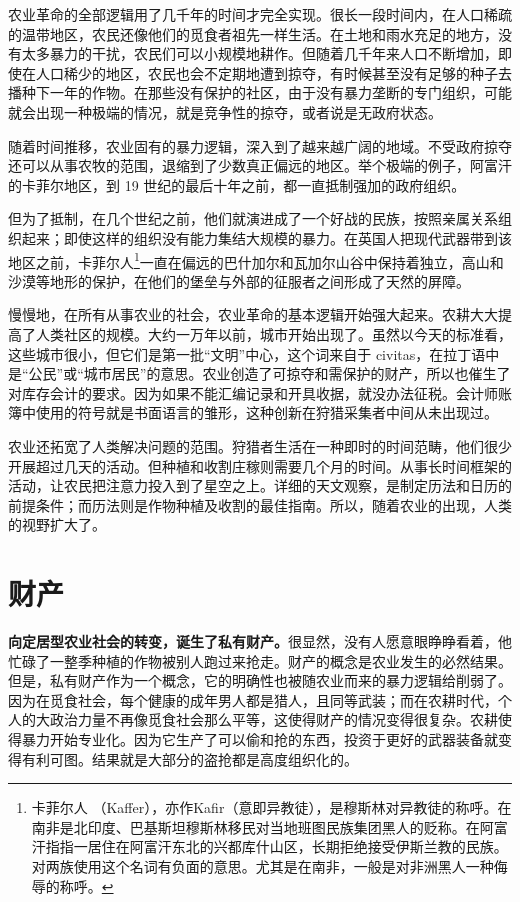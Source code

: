 农业革命的全部逻辑用了几千年的时间才完全实现。很长一段时间内，在人口稀疏的温带地区，农民还像他们的觅食者祖先一样生活。在土地和雨水充足的地方，没有太多暴力的干扰，农民们可以小规模地耕作。但随着几千年来人口不断增加，即使在人口稀少的地区，农民也会不定期地遭到掠夺，有时候甚至没有足够的种子去播种下一年的作物。在那些没有保护的社区，由于没有暴力垄断的专门组织，可能就会出现一种极端的情况，就是竞争性的掠夺，或者说是无政府状态。

随着时间推移，农业固有的暴力逻辑，深入到了越来越广阔的地域。不受政府掠夺还可以从事农牧的范围，退缩到了少数真正偏远的地区。举个极端的例子，阿富汗的卡菲尔地区，到 19 世纪的最后十年之前，都一直抵制强加的政府组织。

但为了抵制，在几个世纪之前，他们就演进成了一个好战的民族，按照亲属关系组织起来；即使这样的组织没有能力集结大规模的暴力。在英国人把现代武器带到该地区之前，卡菲尔人\footnote{卡菲尔人 （Kaffer），亦作Kafir（意即异教徒），是穆斯林对异教徒的称呼。在南非是北印度、巴基斯坦穆斯林移民对当地班图民族集团黑人的贬称。在阿富汗指指一居住在阿富汗东北的兴都库什山区，长期拒绝接受伊斯兰教的民族。对两族使用这个名词有负面的意思。尤其是在南非，一般是对非洲黑人一种侮辱的称呼。}一直在偏远的巴什加尔和瓦加尔山谷中保持着独立，高山和沙漠等地形的保护，在他们的堡垒与外部的征服者之间形成了天然的屏障。

慢慢地，在所有从事农业的社会，农业革命的基本逻辑开始强大起来。农耕大大提高了人类社区的规模。大约一万年以前，城市开始出现了。虽然以今天的标准看，这些城市很小，但它们是第一批“文明”中心，这个词来自于 civitas，在拉丁语中是“公民”或“城市居民”的意思。农业创造了可掠夺和需保护的财产，所以也催生了对库存会计的要求。因为如果不能汇编记录和开具收据，就没办法征税。会计师账簿中使用的符号就是书面语言的雏形，这种创新在狩猎采集者中间从未出现过。

农业还拓宽了人类解决问题的范围。狩猎者生活在一种即时的时间范畴，他们很少开展超过几天的活动。但种植和收割庄稼则需要几个月的时间。从事长时间框架的活动，让农民把注意力投入到了星空之上。详细的天文观察，是制定历法和日历的前提条件；而历法则是作物种植及收割的最佳指南。所以，随着农业的出现，人类的视野扩大了。

\section{财产}
\textbf{向定居型农业社会的转变，诞生了私有财产。}很显然，没有人愿意眼睁睁看着，他忙碌了一整季种植的作物被别人跑过来抢走。财产的概念是农业发生的必然结果。但是，私有财产作为一个概念，它的明确性也被随农业而来的暴力逻辑给削弱了。因为在觅食社会，每个健康的成年男人都是猎人，且同等武装；而在农耕时代，个人的大政治力量不再像觅食社会那么平等，这使得财产的情况变得很复杂。农耕使得暴力开始专业化。因为它生产了可以偷和抢的东西，投资于更好的武器装备就变得有利可图。结果就是大部分的盗抢都是高度组织化的。

